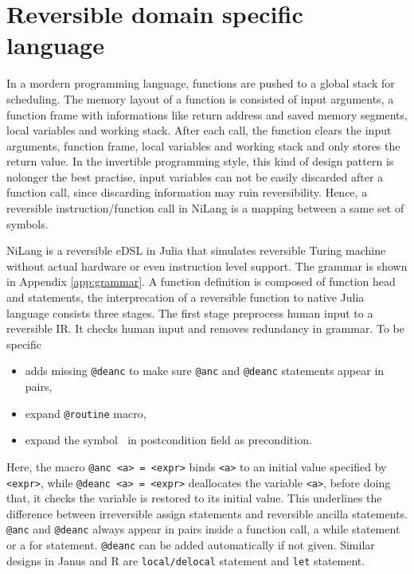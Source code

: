 \documentclass[aps,twocolumn,longbibliography,english,superscriptaddress,prr]{revtex4-1}
\newcommand{\<}{\langle}
\renewcommand{\>}{\rangle}
\newcommand{\App}[1]{Appendix \ref{#1}}
\theoremstyle{definition}\newtheorem{definition}{\textit{Definition}}
\begin{document}
\section{Reversible domain specific language}
In a mordern programming language, functions are pushed to a global stack for scheduling. The memory layout of a function is consisted of input arguments, a function frame with informations like return address and saved memory segments, local variables and working stack. After each call, the function clears the input arguments, function frame, local variables and working stack and only stores the return value.
In the invertible programming style, this kind of design pattern is nolonger the best practise, input variables can not be easily discarded after a function call, since discarding information may ruin reversibility. Hence, a reversible instruction/function call in NiLang is a mapping between a same set of symbols.

NiLang is a reversible eDSL in Julia that simulates reversible Turing machine without actual hardware or even instruction level support. The grammar is shown in \App{app:grammar}. A function definition is composed of function head and statements, the interprecation of a reversible function to native Julia language consists three stages.
The first stage preprocess human input to a reversible IR. It checks human input and removes redundancy in grammar. To be specific
\begin{itemize}
    \item adds missing \texttt{@deanc} to make sure \texttt{@anc} and \texttt{@deanc} statements appear in pairs,
    \item expand \texttt{@routine} macro,
    \item expand the symbol \texttt{$~$} in postcondition field as precondition.
\end{itemize}

    Here, the macro \texttt{@anc <a> = <expr>} binds \texttt{<a>} to an initial value specified by \texttt{<expr>}, while \texttt{@deanc <a> = <expr>} deallocates the variable \texttt{<a>}, before doing that, it checks the variable is restored to its initial value. This underlines the difference between irreversible assign statements and reversible ancilla statements. \texttt{@anc} and \texttt{@deanc} always appear in pairs inside a function call, a while statement or a for statement. \texttt{@deanc} can be added automatically if not given. Similar designs in Janus and R are \texttt{local/delocal} statement and \texttt{let} statement.
\end{document}
